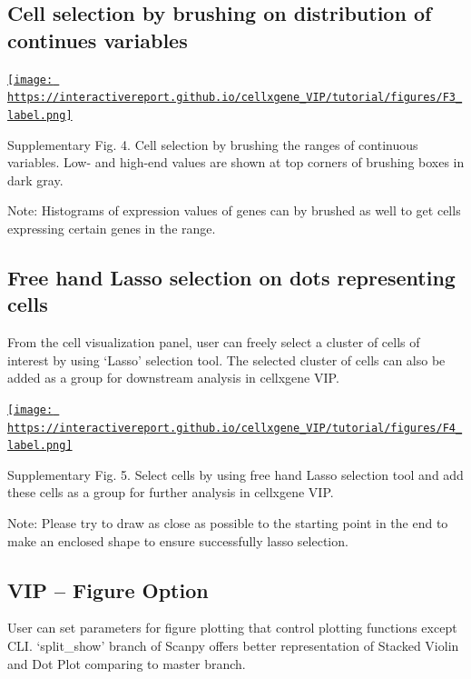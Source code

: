 \documentclass[
]{article}
\begin{document}
\hypertarget{cell-selection-by-brushing-on-distribution-of-continues-variables}{%
\subsection{Cell selection by brushing on distribution of continues variables}\label{cell-selection-by-brushing-on-distribution-of-continues-variables}}

\href{https://interactivereport.github.io/cellxgene_VIP/tutorial/figures/F3_label.png}{\texttt{[image: https://interactivereport.github.io/cellxgene\_VIP/tutorial/figures/F3\_label.png]}}

Supplementary Fig. 4. Cell selection by brushing the ranges of continuous variables. Low- and high-end values are shown at top corners of brushing boxes in dark gray.

Note: Histograms of expression values of genes can by brushed as well to get cells expressing certain genes in the range.

\hypertarget{free-hand-lasso-selection-on-dots-representing-cells}{%
\subsection{Free hand Lasso selection on dots representing cells}\label{free-hand-lasso-selection-on-dots-representing-cells}}

From the cell visualization panel, user can freely select a cluster of cells of interest by using `Lasso' selection tool. The selected cluster of cells can also be added as a group for downstream analysis in cellxgene VIP.

\href{https://interactivereport.github.io/cellxgene_VIP/tutorial/figures/F4_label.png}{\texttt{[image: https://interactivereport.github.io/cellxgene\_VIP/tutorial/figures/F4\_label.png]}}

Supplementary Fig. 5. Select cells by using free hand Lasso selection tool and add these cells as a group for further analysis in cellxgene VIP.

Note: Please try to draw as close as possible to the starting point in the end to make an enclosed shape to ensure successfully lasso selection.

\hypertarget{vip-figure-option}{%
\subsection{VIP -- Figure Option}\label{vip-figure-option}}

User can set parameters for figure plotting that control plotting functions except CLI. `split\_show' branch of Scanpy offers better representation of Stacked Violin and Dot Plot comparing to master branch.
\end{document}
